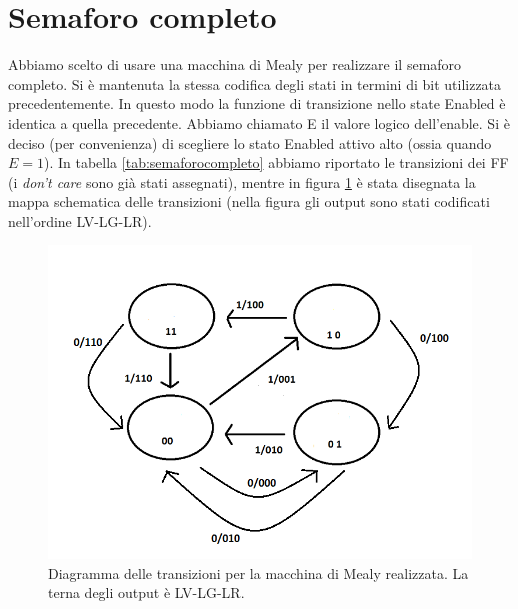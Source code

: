 \documentclass[10pt,a4paper]{article}
\begin{document}
\section{Semaforo completo}
Abbiamo scelto di usare una macchina di Mealy per realizzare il semaforo completo. Si è mantenuta la stessa codifica degli stati in termini di bit utilizzata precedentemente. In questo modo la funzione di transizione nello state Enabled è identica a quella precedente. Abbiamo chiamato E il valore logico dell'enable.
Si è deciso (per convenienza) di scegliere lo stato Enabled attivo alto (ossia quando $E = 1$). In tabella \ref{tab:semaforocompleto} abbiamo riportato le transizioni dei FF (i \emph{don't care} sono già stati assegnati), mentre in figura \ref{fig:FSMcomplete} è stata disegnata la mappa schematica delle transizioni (nella figura gli output sono stati codificati nell'ordine LV-LG-LR).

\begin{figure}[!htb]
\centering
\includegraphics[scale=0.7]{FSMcomplete.png}
\caption{Diagramma delle transizioni per la macchina di Mealy realizzata. La terna degli output è LV-LG-LR.\label{fig:FSMcomplete}}
\end{figure}
\end{document}
